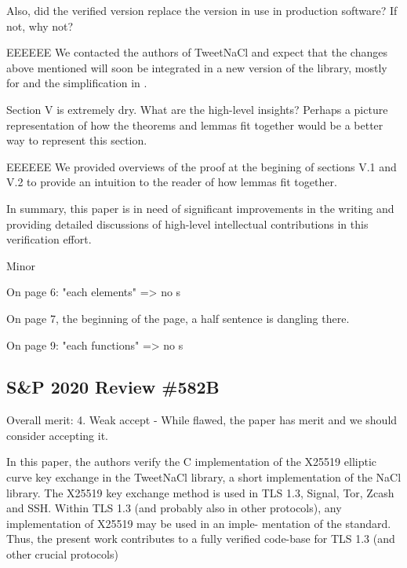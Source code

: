 Also, did the verified version replace the version in use in
production software? If not, why not?

\begin{answer}{EEEEEE}
We contacted the authors of TweetNaCl and expect that the
changes above mentioned will soon be integrated in a new
version of the library, mostly for  and the simplification in
.
\end{answer}

Section V is extremely dry. What are the high-level insights? Perhaps a picture
representation of how the theorems and lemmas fit together would be a better way
to represent this section.

\begin{answer}{EEEEEE}
We provided overviews of the proof at the begining of
sections V.1 and V.2 to provide an intuition to the reader of
how lemmas fit together.
\end{answer}

In summary, this paper is in need of significant improvements in the writing and
providing detailed discussions of high-level intellectual contributions in this
verification effort.

Minor

On page 6: "each elements" => no s

On page 7, the beginning of the page, a half sentence is
dangling there.

On page 9: "each functions" => no s


\subsection{S\&P 2020 Review \#582B}

Overall merit: 4. Weak accept - While flawed, the paper has merit and we should
consider accepting it.


\begin{center}
\end{center}

In this paper, the authors verify the C implementation of the
X25519 elliptic curve key exchange in the TweetNaCl library,
a short implementation of the NaCl library. The X25519 key
exchange method is used in TLS 1.3, Signal, Tor, Zcash and
SSH. Within TLS 1.3 (and probably also in other protocols),
any implementation of X25519 may be used in an imple-
mentation of the standard. Thus, the present work contributes
to a fully verified code-base for TLS 1.3 (and other crucial
protocols)

